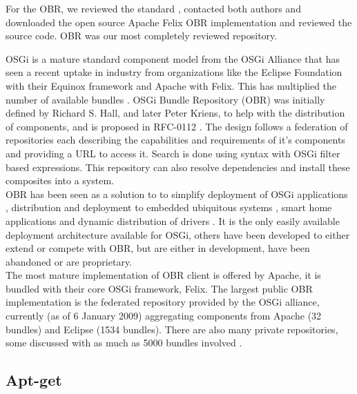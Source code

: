 For the OBR, we reviewed the standard \cite{the_osgi_alliance_rfc-0112_2006}, 
contacted both authors \cite{kriens_osgi_2008, richard_s._hall_obr_2008} 
and downloaded the open source Apache Felix OBR implementation and reviewed the source code.
OBR was our most completely reviewed repository.

OSGi is a 
mature standard component model from the OSGi Alliance that has seen a recent uptake in industry \cite{kriens_osgi_2008} 
from organizations like the Eclipse Foundation with their Equinox framework and Apache with Felix. This has multiplied the 
number of available bundles \cite{the_osgi_alliance_rfc-0112_2006}. OSGi Bundle Repository (OBR) was initially defined by 
Richard S. Hall, and later Peter Kriens, to help with the distribution of components, and is proposed in 
RFC-0112 \cite{the_osgi_alliance_rfc-0112_2006}. The design follows a federation of repositories each describing 
the capabilities and requirements of it's components and providing a URL to access it. Search is done using syntax with OSGi filter 
based expressions. This repository can also resolve dependencies and install these composites into a system. \\
OBR has been seen as a solution to to simplify deployment of OSGi applications
\cite{jung_integrating_2007}, distribution and deployment to embedded
ubiquitous systems \cite{jung_embedded_2006}, smart home applications \cite{gouin-vallerand_managing_2007} and 
dynamic distribution of drivers \cite{kriens_osgi_2008}. It is the only easily available deployment 
architecture available for OSGi, others have been developed to either extend or compete \cite{frnot_component_2005} with OBR, 
but are either in development, have been abandoned or are proprietary.\\ 
The most mature implementation of OBR client is offered by Apache, it is bundled with their core OSGi framework, Felix. 
The largest public OBR implementation is the federated repository provided by the OSGi alliance,
currently (as of 6 January 2009) aggregating components from Apache (32 bundles) and Eclipse (1534 bundles).
There are also many private repositories, some discussed with as much as 5000 bundles involved \cite{kriens_osgi_2008}.\\  

\subsection{Apt-get}

